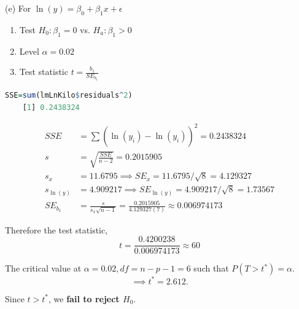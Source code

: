 \documentclass[boxes, qed]{homework}
\begin{document}
\begin{solution}
  (e) For $\ln(y)=\beta_0+\beta_1x+\epsilon$
  \begin{enumerate}
    \item Test $H_0: \beta_1=0$ vs. $H_a:\beta_1>0$
    \item Level $\alpha=0.02$
    \item Test statistic $t=\frac{b_1}{SE_{b_1}}$
  \end{enumerate}

  \begin{lstlisting}[backgroundcolor = \color{lightgray},language = R]
    SSE=sum(lmLnKilo$residuals^2)
    [1] 0.2438324
  \end{lstlisting}

  \begin{align*}
    SSE &= \sum(\ln(y_i)-\hat{\ln(y_i)})^2 = 0.2438324\\
    s &= \sqrt{\frac{SSE}{n-2}} = 0.2015905\\
    s_x &= 11.6795 \implies SE_x=11.6795/\sqrt{8} = 4.129327\\
    s_{\ln(y)} &= 4.909217 \implies SE_{\ln(y)}=4.909217/\sqrt{8} = 1.73567\\
    SE_{b_1} &= \frac{s}{s_x\sqrt{n-1}}
      = \frac{0.2015905}{4.129327(7)}
      \approx 0.006974173
  \end{align*}
  
  Therefore the test statistic, 
  $$t=\frac{0.4200238}{0.006974173} \approx \boxed{60}$$

  The critical value at $\alpha=0.02, df=n-p-1=6$ such that $P(T>t^*)=\alpha$.
  $$\implies \boxed{t^*=2.612}.$$

  Since $t>t^*$, we \textbf{fail to reject $H_0$}.\\
\end{solution}
\end{document}
